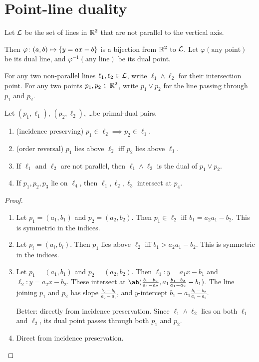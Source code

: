 
\section{Point-line duality} \label{sec:duality}
Let $\mathcal{L}$ be the set of lines in $\mathbb{R}^2$ that are not parallel to the
vertical axis.

Then $\varphi\colon (a, b) \mapsto \{y = ax - b\}$ is a bijection from
$\mathbb{R}^2$ to $\mathcal{L}$.
Let $\varphi(\text{any point})$ be its dual line,
and $\varphi^{-1}(\text{any line})$ be its dual point.

For any two non-parallel lines $\ell_1, \ell_2 \in \mathcal{L}$, write
$\ell_1 \land \ell_2$ for their intersection point.
For any two points $p_1, p_2 \in \mathbb{R}^2$, write $p_1 \lor p_2$ for the
line passing through $p_1$ and $p_2$.
\begin{proposition}
    Let $(p_1, \ell_1)$, $(p_2, \ell_2)$, \dots be primal-dual pairs.
    \begin{enumerate}
        \item (incidence preserving) $p_1 \in \ell_2 \implies
        p_2 \in \ell_1$.
        \item (order reversal) $p_1$ lies above $\ell_2$ iff $p_2$ lies
        above $\ell_1$.
        \item If $\ell_1$ and $\ell_2$ are not parallel, then
        $\ell_1 \land \ell_2$ is the dual of $p_1 \lor p_2$.
        \item If $p_1, p_2, p_3$ lie on $\ell_4$, then
        $\ell_1, \ell_2, \ell_3$ intersect at $p_4$.
    \end{enumerate}
\end{proposition}
\begin{proof} \leavevmode
    \begin{enumerate}
        \item Let $p_1 = (a_1, b_1)$ and $p_2 = (a_2, b_2)$.
        Then $p_1 \in \ell_2$ iff $b_1 = a_2 a_1 - b_2$.
        This is symmetric in the indices.
        \item Let $p_i = (a_i, b_i)$.
        Then $p_1$ lies above $\ell_2$ iff $b_1 > a_2 a_1 - b_2$.
        This is symmetric in the indices.
        \item Let $p_1 = (a_1, b_1)$ and $p_2 = (a_2, b_2)$.
        Then $\ell_1\colon y = a_1x - b_1$ and
        $\ell_2\colon y = a_2x - b_2$.
        These intersect at
        $\ab(\frac{b_1-b_2}{a_1-a_2}, a_1 \frac{b_1-b_2}{a_1-a_2} - b_1)$.
        The line joining $p_1$ and $p_2$ has slope $\frac{b_2-b_1}{a_2-a_1}$,
        and $y$-intercept $b_1 - a_1 \frac{b_1-b_2}{a_1-a_2}$.

        Better: directly from incidence preservation.
        Since $\ell_1 \land \ell_2$ lies on both $\ell_1$ and $\ell_2$,
        its dual point passes through both $p_1$ and $p_2$.
        \item Direct from incidence preservation.
    \end{enumerate}
\end{proof}

